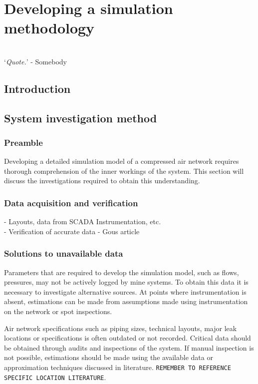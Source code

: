 \chapter{Developing a simulation methodology}
\thispagestyle{empty}
\vspace{38em}
\hrulefill
\\
\enquote*{\textit{Quote.}} - Somebody\\
\newpage
\section{Introduction}
\section{System investigation method}
	\subsection{Preamble}
		Developing a detailed simulation model of a compressed air network requires thorough comprehension of the inner workings of the system. This section will discuss the investigations required to obtain this understanding.
	\subsection{Data acquisition and verification} %
		- Layouts, data from SCADA Instrumentation, etc.\\
		- Verification of accurate data - Gous article
	\subsection{Solutions to unavailable data}
		Parameters that are required to develop the simulation model, such as flows, pressures, may not be actively logged by mine systems. To obtain this data it is necessary to investigate alternative sources. At points where instrumentation is absent, estimations can be made from assumptions made using instrumentation on the network or spot inspections.
		\par 
		Air network specifications such as piping sizes, technical layouts, major leak locations or specifications is often outdated or not recorded. Critical data should be obtained through audits and inspections of the system. If manual inspection is not possible, estimations should be made using the available data or approximation techniques discussed in literature. \texttt{REMEMBER TO REFERENCE SPECIFIC LOCATION LITERATURE}.

